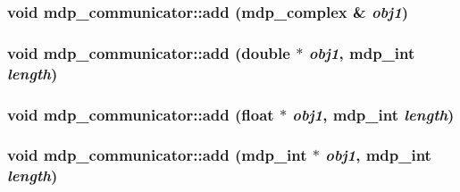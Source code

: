 \label{classmdp__communicator_aa5349744a5384adbbdd3cf7dc2a5b95a}
\hypertarget{classmdp__communicator_a94f4656c5dd9befe04abe0cf5bf83de0}{
\subsubsection[{add}]{\setlength{\rightskip}{0pt plus 5cm}void mdp\_\-communicator::add ({\bf mdp\_\-complex} \& {\em obj1})}}
\label{classmdp__communicator_a94f4656c5dd9befe04abe0cf5bf83de0}
\hypertarget{classmdp__communicator_ac78cceeab56a8e83a1921e1e930ce7d1}{
\subsubsection[{add}]{\setlength{\rightskip}{0pt plus 5cm}void mdp\_\-communicator::add (double $\ast$ {\em obj1}, \/  {\bf mdp\_\-int} {\em length})}}
\label{classmdp__communicator_ac78cceeab56a8e83a1921e1e930ce7d1}
\hypertarget{classmdp__communicator_a931be4e0b188065e33a16877a63bfe01}{
\subsubsection[{add}]{\setlength{\rightskip}{0pt plus 5cm}void mdp\_\-communicator::add (float $\ast$ {\em obj1}, \/  {\bf mdp\_\-int} {\em length})}}
\label{classmdp__communicator_a931be4e0b188065e33a16877a63bfe01}
\hypertarget{classmdp__communicator_aedb0bdc142ac49ff99bfa185d8f8da09}{
\subsubsection[{add}]{\setlength{\rightskip}{0pt plus 5cm}void mdp\_\-communicator::add ({\bf mdp\_\-int} $\ast$ {\em obj1}, \/  {\bf mdp\_\-int} {\em length})}}
